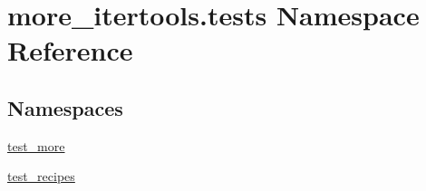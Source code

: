 \hypertarget{namespacemore__itertools_1_1tests}{}\section{more\+\_\+itertools.\+tests Namespace Reference}
\label{namespacemore__itertools_1_1tests}
\subsection*{Namespaces}
\begin{DoxyCompactItemize}
\item 
 \hyperlink{namespacemore__itertools_1_1tests_1_1test__more}{test\+\_\+more}
\item 
 \hyperlink{namespacemore__itertools_1_1tests_1_1test__recipes}{test\+\_\+recipes}
\end{DoxyCompactItemize}
